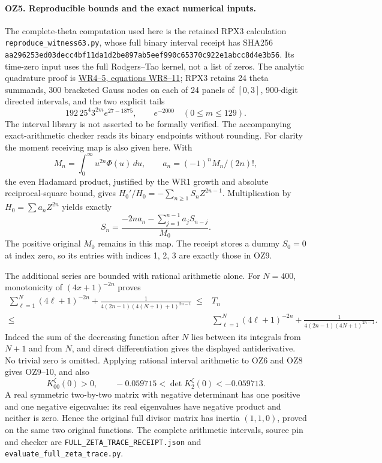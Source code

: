 \paragraph{OZ5. Reproducible bounds and the exact numerical inputs.}
The complete-theta computation used here is the retained
RPX3 calculation \texttt{reproduce\_witness63.py}, whose full
binary interval receipt has SHA256
\nolinkurl{aa296253ed03decc4bf11da1d2be897ab5eef990c65370c922e1abcc8d4e3b56}.
Its time-zero input uses the full Rodgers--Tao kernel, not a list
of zeros. The analytic quadrature proof is
\href{https://github.com/KokunoYumeto/zeta-function-research-reader/blob/87e386271c488ce5914b9926c4d23d0857e0c367/workbenches/splitzero-tandem/continuations/20260923-boundary-residue-arithmetic/BOUNDARY_RESIDUE_ARITHMETIC_RECEIVERS.tex}
{WR4--5, equations WR8--11}; RPX3 retains 24 theta summands,
300 bracketed Gauss nodes on each of 24 panels of \([0,3]\),
900-digit directed intervals, and the two explicit tails
\[
 192\,25^4 3^{2m}e^{27-1875},\qquad e^{-2000}
 \quad(0\le m\le129).
\]
The interval library is not asserted to be formally verified.
The accompanying exact-arithmetic checker reads its binary
endpoints without rounding. For clarity the moment receiving
map is also given here. With
\[
 M_n=\int_0^\infty u^{2n}\Phi(u)\,du,\qquad
 a_n=(-1)^nM_n/(2n)!,
\]
the even Hadamard product, justified by the WR1 growth and
absolute reciprocal-square bound, gives
\(H_0'/H_0=-\sum_{n\ge1}S_nZ^{2n-1}\). Multiplication by
\(H_0=\sum a_nZ^{2n}\) yields exactly
\[
 S_n=\frac{-2na_n-\sum_{j=1}^{n-1}a_jS_{n-j}}{M_0}.
                                                               \tag{OZ11}
\]
The positive original \(M_0\) remains in this map. The receipt
stores a dummy \(S_0=0\) at index zero, so its entries with
indices 1, 2, 3 are exactly those in OZ9.

The additional series are bounded with rational arithmetic alone.
For \(N=400\), monotonicity of \((4x+1)^{-2n}\) proves
\[
 \begin{split}
 \sum_{\ell=1}^N(4\ell+1)^{-2n}
   +\frac1{4(2n-1)(4(N+1)+1)^{2n-1}}
 \ \le{}& T_n\\
 \le{}&\sum_{\ell=1}^N(4\ell+1)^{-2n}
   +\frac1{4(2n-1)(4N+1)^{2n-1}} .
 \end{split}\tag{OZ12}
\]
Indeed the sum of the decreasing function after \(N\) lies
between its integrals from \(N+1\) and from \(N\), and direct
differentiation gives the displayed antiderivative. No trivial
zero is omitted. Applying rational interval arithmetic to OZ6
and OZ8 gives OZ9--10, and also
\[
 K_{00}^\zeta(0)>0,\qquad
 -0.059715<\det K_2^\zeta(0)<-0.059713.           \tag{OZ13}
\]
A real symmetric two-by-two matrix with negative determinant has
one positive and one negative eigenvalue: its real eigenvalues
have negative product and neither is zero. Hence the original
full divisor matrix has inertia \((1,1,0)\), proved on the
same two original functions. The complete arithmetic intervals,
source pin and checker are \texttt{FULL\_ZETA\_TRACE\_RECEIPT.json}
and \texttt{evaluate\_full\_zeta\_trace.py}.

